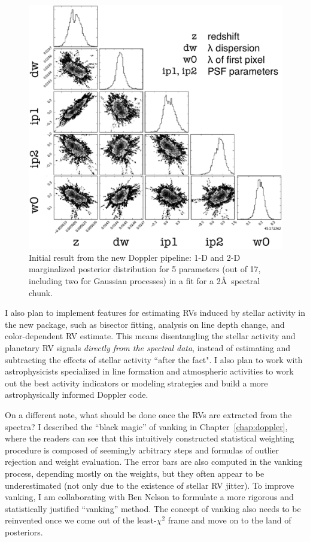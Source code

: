 \begin{figure}
\centering
\includegraphics[scale=0.25]{conclusion/mcmcplot-labeled.eps}
\caption{Initial result from the new Doppler pipeline: 1-D and 2-D
  marginalized posterior distribution for 5 parameters (out of 17,
  including two for Gaussian processes) in a fit for a 2\AA\ spectral
  chunk.\label{conclusion:fig:mcmc}}
\end{figure}


I also plan to implement features for estimating RVs induced by
stellar activity in the new package, such as bisector fitting,
analysis on line depth change, and color-dependent RV estimate. This
means disentangling the stellar activity and planetary RV signals
{\em directly from the spectral data}, instead of
estimating and subtracting the effects of stellar activity ``after the
fact". I also plan to work with astrophysicists specialized in line
formation and atmospheric activities to work out the best activity
indicators or modeling strategies and build a more astrophysically
informed Doppler code.

On a different note, what should be done once the RVs are extracted
from the spectra? I described the ``black magic'' of vanking in
Chapter~\ref{chap:doppler}, where the readers can see that this
intuitively constructed statistical weighting procedure is composed of
seemingly arbitrary steps and formulas of outlier rejection and weight
evaluation. The error bars are also computed in the vanking process,
depending mostly on the weights, but they often appear to be
underestimated (not only due to the existence of stellar RV
jitter). To improve vanking, I am collaborating with Ben Nelson to
formulate a more rigorous and statistically justified ``vanking''
method. The concept of vanking also needs to be reinvented once we
come out of the least-$\chi^2$ frame and move on to the land of
posteriors.

